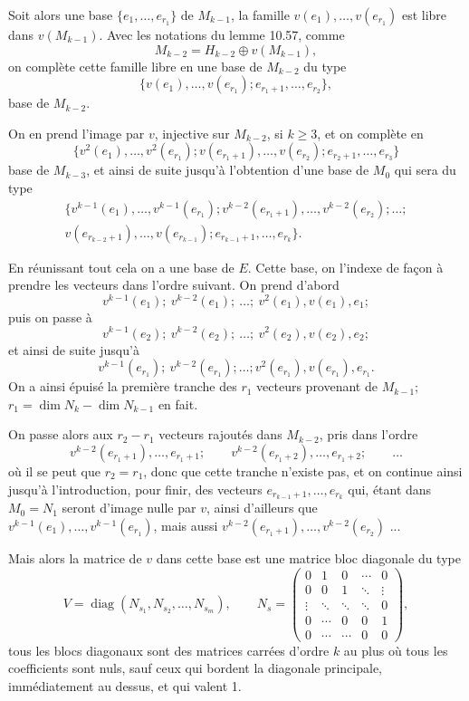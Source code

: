 Soit alors une base $\{e_1,\ldots,e_{r_1}\}$ de $M_{k-1}$, la famille $v(e_1),\ldots,v(e_{r_1})$ est libre dans $v(M_{k-1})$. Avec les notations du lemme 10.57, comme
\[
M_{k-2}=H_{k-2}\oplus v(M_{k-1}),
\]
on complète cette famille libre en une base de $M_{k-2}$ du type
\[
\{v(e_1),\ldots,v(e_{r_1});e_{r_1+1},\ldots,e_{r_2}\},
\]
base de $M_{k-2}$.

On en prend l'image par $v$, injective sur $M_{k-2}$, si $k\ge3$, et on complète en
\[
\{v^2(e_1),\ldots,v^2(e_{r_1});v(e_{r_1+1}),\ldots,v(e_{r_2});e_{r_2+1},\ldots,e_{r_3}\}
\]
base de $M_{k-3}$, et ainsi de suite jusqu'à l'obtention d'une base de $M_0$ qui sera du type
\[
\begin{gathered}
\{v^{k-1}(e_1),\ldots,v^{k-1}(e_{r_1});
 v^{k-2}(e_{r_1+1}),\ldots,v^{k-2}(e_{r_2});\ldots;\\
 v(e_{r_{k-2}+1}),\ldots,v(e_{r_{k-1}});
 e_{r_{k-1}+1},\ldots,e_{r_k}\}.
\end{gathered}
\]

En réunissant tout cela on a une base de $E$. Cette base, on l'indexe de façon à prendre les vecteurs dans l'ordre suivant. On prend d'abord
\[
v^{k-1}(e_1);\ v^{k-2}(e_1);\ \ldots;\ v^2(e_1),v(e_1),e_1;
\]
puis on passe à
\[
v^{k-1}(e_2);\ v^{k-2}(e_2);\ \ldots;\ v^2(e_2),v(e_2),e_2;
\]
et ainsi de suite jusqu'à
\[
v^{k-1}(e_{r_1});\ v^{k-2}(e_{r_1});\ldots;v^2(e_{r_1}),v(e_{r_1}),e_{r_1}.
\]
On a ainsi épuisé la première tranche des $r_1$ vecteurs provenant de $M_{k-1}$; $r_1=\dim N_k-\dim N_{k-1}$ en fait.

On passe alors aux $r_2-r_1$ vecteurs rajoutés dans $M_{k-2}$, pris dans l'ordre
\[
v^{k-2}(e_{r_1+1}),\ldots,e_{r_1+1};\qquad
v^{k-2}(e_{r_1+2}),\ldots,e_{r_1+2};\qquad\ldots
\]
où il se peut que $r_2=r_1$, donc que cette tranche n'existe pas, et on continue ainsi jusqu'à l'introduction, pour finir, des vecteurs $e_{r_{k-1}+1},\ldots,e_{r_k}$ qui, étant dans $M_0=N_1$ seront d'image nulle par $v$, ainsi d'ailleurs que $v^{k-1}(e_1),\ldots,v^{k-1}(e_{r_1})$, mais aussi $v^{k-2}(e_{r_1+1}),\ldots,v^{k-2}(e_{r_2})$ ...

Mais alors la matrice de $v$ dans cette base est une matrice bloc diagonale du type
\[
V=\operatorname{diag}(N_{s_1},N_{s_2},\ldots,N_{s_m}),
\qquad
N_s=\begin{pmatrix}
0&1&0&\cdots&0\\
0&0&1&\ddots&\vdots\\
\vdots&\ddots&\ddots&\ddots&0\\
0&\cdots&0&0&1\\
0&\cdots&\cdots&0&0
\end{pmatrix},
\]
tous les blocs diagonaux sont des matrices carrées d'ordre $k$ au plus où tous les coefficients sont nuls, sauf ceux qui bordent la diagonale principale, immédiatement au dessus, et qui valent 1.

